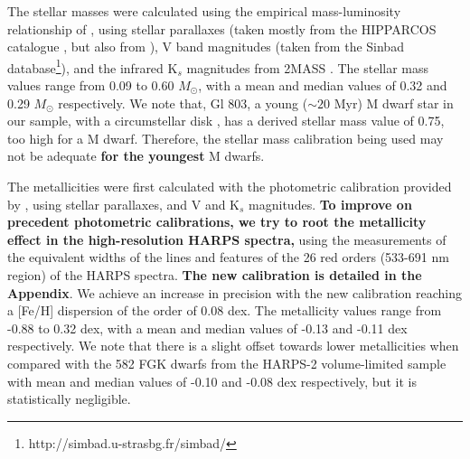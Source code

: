 \documentclass[structabstract]{aa}
\begin{document}
The stellar masses were calculated using the empirical mass-luminosity relationship of \citet{Delfosse-2000}, using stellar parallaxes (taken mostly from the HIPPARCOS catalogue \citep{van_Leeuwen-2007} , but also from \citet{van_Altena-1995, Jahreiss-1997, Hawley-1997, Henry-2006}), V band magnitudes (taken from the Sinbad database\footnote{http://simbad.u-strasbg.fr/simbad/}), and the infrared K$_{s}$ magnitudes from 2MASS \citep{Skrutskie-2006}. The stellar mass values range from 0.09 to 0.60 $M_{\odot}$, with a mean and median values of 0.32 and 0.29 $M_{\odot}$ respectively. We note that, Gl 803, a young ($\sim 20$ Myr) M dwarf star in our sample, with a circumstellar disk \citep{Kalas-2004}, has a derived stellar mass value of 0.75, too high for a M dwarf. Therefore, the stellar mass calibration being used may not be adequate \textbf{for the youngest} M dwarfs. 

The metallicities were first calculated with the photometric calibration provided by \citet{Neves-2012}, using stellar parallaxes, and V and K$_{s}$ magnitudes. 
\textbf{To improve on precedent photometric calibrations, we try to root the metallicity effect in the high-resolution HARPS spectra,} using the measurements of the equivalent widths of the lines and features of the 26 red orders (533-691 nm region) of the HARPS spectra. \textbf{The new calibration is detailed in the Appendix}. We achieve an increase in precision with the new calibration reaching a [Fe/H] dispersion of the order of 0.08 dex. The metallicity values range from -0.88 to 0.32 dex, with a mean and median values of -0.13 and -0.11 dex respectively. We note that there is a slight offset towards lower metallicities when compared with the 582 FGK dwarfs from the HARPS-2 volume-limited sample \citep{Sousa-2011b} with mean and median values of -0.10 and -0.08 dex respectively, but it is statistically negligible.

\end{document}
